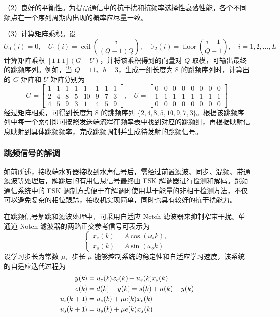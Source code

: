 （2）良好的平衡性。为提高通信中的抗干扰和抗频率选择性衰落性能，各个不同频点在一个序列周期内出现的概率应尽量一致。

（3）计算矩阵乘积。设
\begin{equation}
U_0(i)=0,\quad
U_1(i)=\operatorname{ceil}\left(\frac{i}{(Q-1)Q}\right),\quad
U_2(i)=\operatorname{floor}\left(\frac{i-1}{Q-1}\right),
\quad i=1,2,\ldots,L
\label{eq:fh-u-matrix-elements}
\end{equation}
计算矩阵乘积 $[1\ 1\ 1](G-U)$，并将该乘积得到的向量对 $Q$ 取模，可输出最终的跳频序列。例如，当 $Q=11$、$b=3$，生成一组长度为 8 的跳频序列时，计算出的 $G$ 矩阵和 $U$ 矩阵分别为
\begin{equation}
G=
\begin{bmatrix}
1&1&1&1&1&1&1&1\\
2&4&8&5&10&9&7&3\\
4&5&9&3&1&4&5&9
\end{bmatrix},
\quad
U=
\begin{bmatrix}
0&0&0&0&0&0&0&0\\
1&1&1&1&1&1&1&1\\
0&0&0&0&0&0&0&0
\end{bmatrix}
\label{eq:fh-example-matrices}
\end{equation}
经过矩阵相乘，可得到长度为 8 的跳频序列 $\{2,4,8,5,10,9,7,3\}$。根据该跳频序列中每一个索引即可按照发送端流程在频率表中找到对应的跳频组，再根据映射信息映射到具体跳频频率，完成跳频调制并生成待发射的跳频信号。

\subsubsection{跳频信号的解调}

如前所述，接收端水听器接收到水声信号后，需经过前置滤波、同步、混频、带通滤波等处理后，解跳后的有用信息信号最终由 FSK 解调器进行检测和解码。跳频通信系统中的 FSK 调制方式便于在解调时使用基于能量的非相干检测方法，不仅可以避免复杂的相位跟踪，接收机实现简单，同时也具有较好的抗干扰能力。

在跳频信号解跳和滤波处理中，可采用自适应 Notch 滤波器来抑制窄带干扰。单通道 Notch 滤波器的两路正交参考信号可表示为
\begin{equation}
\begin{cases}
x_c(k)=A\cos(\omega_o k),\\
x_s(k)=A\sin(\omega_o k)
\end{cases}
\label{eq:fh-single-channel-reference}
\end{equation}
设学习步长为常数 $\mu$，步长 $\mu$ 能够控制系统的稳定性和自适应学习速度，该系统的自适应迭代过程为
\begin{align}
y(k)&=u_c(k)x_c(k)+u_s(k)x_s(k)
\label{eq:fh-notch-output}\\
e(k)&=d(k)-y(k)=s(k)+n(k)-y(k)
\label{eq:fh-notch-error}\\
u_c(k+1)&=u_c(k)+\mu e(k)x_c(k) \notag\\
u_s(k+1)&=u_s(k)+\mu e(k)x_s(k)
\label{eq:fh-notch-update}
\end{align}

